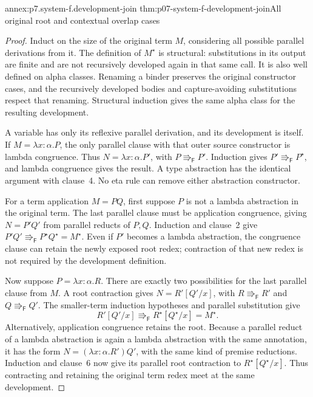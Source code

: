 \begin{annexitem}{annex:p7.system-f.development-join}
 {thm:p07-system-f-development-join}{All original root and contextual overlap cases}
\begin{proof}
Induct on the size of the original term \(M\), considering all possible
parallel derivations from it. The definition of \(M^\star\) is
structural: substitutions in its output are finite and are not recursively
developed again in that same call.
It is also well defined on alpha classes. Renaming a binder preserves
the original constructor cases, and the recursively developed bodies
and capture-avoiding substitutions respect that renaming. Structural
induction gives the same alpha class for the resulting development.

A variable has only its reflexive parallel derivation, and its development
is itself. If \(M=\lambda x{:}\alpha.P\), the only parallel clause
with that outer source constructor is lambda congruence. Thus
\(N=\lambda x{:}\alpha.P'\), with \(P\Rrightarrow_{\mathsf F}P'\).
Induction gives \(P'\Rrightarrow_{\mathsf F}P^\star\), and lambda
congruence gives the result. A type abstraction has the identical argument
with clause~4. No eta rule can remove either abstraction constructor.

For a term application \(M=PQ\), first suppose \(P\) is not a
lambda abstraction in the original term. The last parallel clause must
be application congruence, giving \(N=P'Q'\) from parallel reducts
of \(P,Q\). Induction and clause~2 give
\(P'Q'\Rrightarrow_{\mathsf F}P^\star Q^\star=M^\star\).
Even if \(P'\) becomes a lambda abstraction, the congruence clause
can retain the newly exposed root redex; contraction of that new redex
is not required by the development definition.

Now suppose \(P=\lambda x{:}\alpha.R\). There are exactly two
possibilities for the last parallel clause from \(M\). A root
contraction gives \(N=R'[Q'/x]\), with \(R\Rrightarrow_{\mathsf F}R'\)
and \(Q\Rrightarrow_{\mathsf F}Q'\). The smaller-term induction
hypotheses and parallel substitution give
\[
 R'[Q'/x]\Rrightarrow_{\mathsf F}R^\star[Q^\star/x]=M^\star.
\]
Alternatively, application congruence retains the root. Because a
parallel reduct of a lambda abstraction is again a lambda abstraction
with the same annotation, it has the form
\(N=(\lambda x{:}\alpha.R')Q'\), with the same kind of premise
reductions. Induction and clause~6 now give its parallel root contraction
to \(R^\star[Q^\star/x]\). Thus contracting and retaining the
original term redex meet at the same development.


\end{proof}
\end{annexitem}
